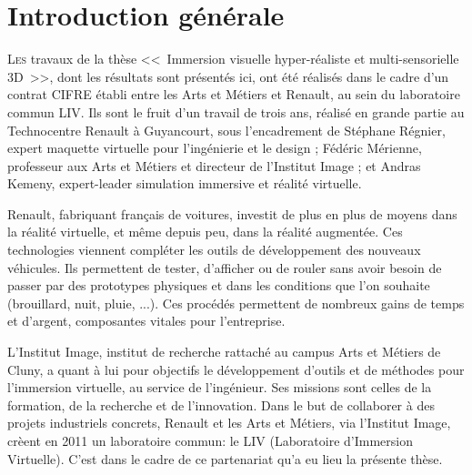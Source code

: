 \chapter*{Introduction générale}

\lettrine[lines=3]{L}{es} travaux de la thèse <<~Immersion visuelle hyper-réaliste et multi-sensorielle 3D~>>, dont les résultats sont présentés ici, ont été réalisés dans le cadre d’un contrat CIFRE établi entre les Arts et Métiers et Renault, au sein du laboratoire commun LIV. Ils sont le fruit d'un travail de trois ans, réalisé en grande partie au Technocentre Renault à Guyancourt, sous l'encadrement de Stéphane Régnier, expert maquette virtuelle pour l'ingénierie et le design ; Fédéric Mérienne, professeur aux Arts et Métiers et directeur de l'Institut Image ; et Andras Kemeny, expert-leader simulation immersive et réalité virtuelle.

\par Renault, fabriquant français de voitures, investit de plus en plus de moyens dans la réalité virtuelle, et même depuis peu, dans la réalité augmentée. Ces technologies viennent compléter les outils de développement des nouveaux véhicules. Ils permettent de tester, d'afficher ou de rouler sans avoir besoin de passer par des prototypes physiques et dans les conditions que l'on souhaite (brouillard, nuit, pluie, ...). Ces procédés permettent de nombreux gains de temps et d'argent, composantes vitales pour l'entreprise.

\par L'Institut Image, institut de recherche rattaché au campus Arts et Métiers de Cluny, a quant à lui pour objectifs le développement d'outils et de méthodes pour l'immersion virtuelle, au service de l'ingénieur. Ses missions sont celles de la formation, de la recherche et de l'innovation. Dans le but de collaborer à des projets industriels concrets, Renault et les Arts et Métiers, via l'Institut Image, crèent en 2011 un laboratoire commun: le LIV (Laboratoire d'Immersion Virtuelle). C'est dans le cadre de ce partenariat qu'a eu lieu la présente thèse.

